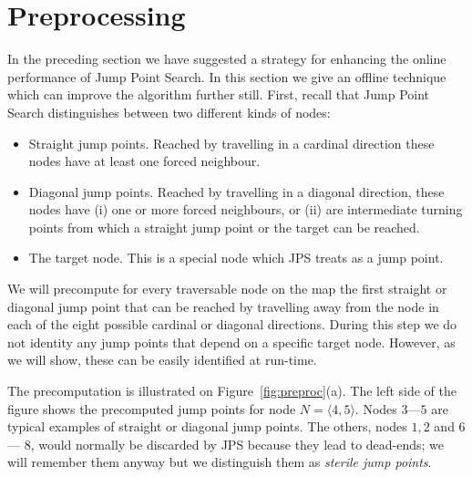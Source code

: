 
\section{Preprocessing}
\label{sec::preprocessing}
In the preceding section we have suggested a strategy for enhancing the
online performance of Jump Point Search.  In this section we give an offline
technique which can improve the algorithm further still. First, recall that 
Jump Point Search distinguishes between two different kinds of
nodes:
\begin{itemize}
\item Straight jump points. Reached by travelling in a
cardinal direction these nodes have at least one forced neighbour.
\item Diagonal jump points. Reached by travelling in a diagonal direction, 
these nodes have (i) one or more forced neighbours, or (ii) are 
intermediate turning points from which a straight jump point or the 
target can be reached.
\item The target node. This is a special node which JPS treats as a jump point.
\end{itemize}

We will precompute for every traversable node on the map the first
straight or diagonal jump point that can be reached by travelling 
away from the node in each of the eight possible cardinal or diagonal 
directions. During this step we do not identity any jump points that 
depend on a specific target node.  However, as we will show, these 
can be easily identified at run-time. 


The precomputation is illustrated on Figure~\ref{fig:preproc}(a).
The left side of the figure shows the precomputed jump points 
for node $N = \langle 4,5\rangle$.  
Nodes $3$---$5$ are typical examples of straight or diagonal 
jump points.  
The others, nodes $1, 2$ and $6$ --- $8$, would normally be discarded 
by JPS because they lead to dead-ends; we will remember them 
anyway but we distinguish them as \emph{sterile jump points}.  

